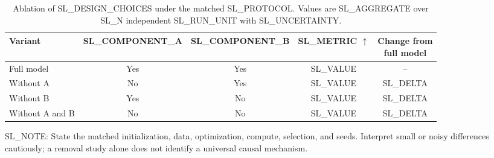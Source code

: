 \begin{table}[t]
  \centering
  \small
  \caption{Ablation of SL_DESIGN_CHOICES under the matched SL_PROTOCOL. Values
  are SL_AGGREGATE over SL_N independent SL_RUN_UNIT with SL_UNCERTAINTY.}
  \label{tab:SL_LABEL}
  \begin{tabular}{lcccc}
    \toprule
    Variant & SL_COMPONENT_A & SL_COMPONENT_B & SL_METRIC $\uparrow$ &
    \shortstack{Change from\\full model} \\
    \midrule
    Full model       & Yes & Yes & SL_VALUE & -- \\
    Without A        & No  & Yes & SL_VALUE & SL_DELTA \\
    Without B        & Yes & No  & SL_VALUE & SL_DELTA \\
    Without A and B  & No  & No  & SL_VALUE & SL_DELTA \\
    \bottomrule
  \end{tabular}

  \parbox{0.98\linewidth}{\footnotesize
  SL_NOTE: State the matched initialization, data, optimization, compute,
  selection, and seeds. Interpret small or noisy differences cautiously; a
  removal study alone does not identify a universal causal mechanism.}
\end{table}
